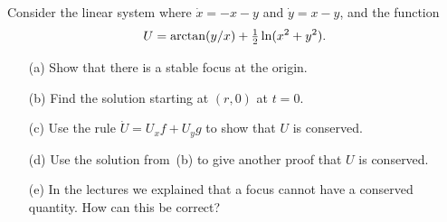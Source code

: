 \documentclass[a4paper]{amsart}
\begin{document}
\begin{exercise}
 Consider the linear system where $\dot{x}=-x-y$ and $\dot{y}=x-y$,
 and the function 
 \[ U = \arctan(y/x) + \tfrac{1}{2}\ln(x^2+y^2). \]
 \begin{itemize}
  \item[(a)] Show that there is a stable focus at the origin.
  \item[(b)] Find the solution starting at $(r,0)$ at $t=0$.
  \item[(c)] Use the rule $\dot{U}=U_xf+U_yg$ to show that $U$ is
   conserved.
  \item[(d)] Use the solution from~(b) to give another proof that $U$
   is conserved.
  \item[(e)] In the lectures we explained that a focus cannot have a
   conserved quantity.  How can this be correct?
 \end{itemize}
\end{exercise}
\end{document}
